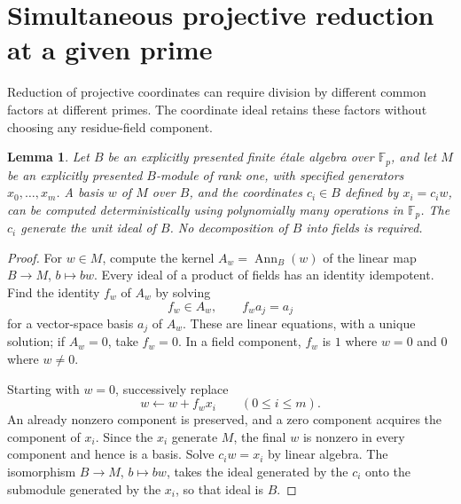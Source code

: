 \documentclass[11pt]{article}
\newtheorem{lemma}[theorem]{Lemma}
\theoremstyle{definition}
\theoremstyle{remark}
\begin{document}
\section{Simultaneous projective reduction at a given prime}
\label{sec:kummer-projective-reduction}

Reduction of projective coordinates can require division by different
common factors at different primes. The coordinate ideal retains
these factors without choosing any residue-field component.

\begin{lemma}\label{lem:kummer-rank-one-patching}
Let \(B\) be an explicitly presented finite \'etale algebra over
\(\mathbb F_p\), and let \(M\) be an explicitly presented
\(B\)-module of rank one, with specified generators
\(x_0,\ldots,x_m\). A basis \(w\) of \(M\) over \(B\), and
the coordinates \(c_i\in B\) defined by \(x_i=c_iw\), can be
computed deterministically using polynomially many operations in
\(\mathbb F_p\). The \(c_i\) generate the unit ideal of \(B\).
No decomposition of \(B\) into fields is required.
\end{lemma}
\begin{proof}
For \(w\in M\), compute the kernel
\(A_w=\operatorname{Ann}_B(w)\) of the linear map
\(B\longrightarrow M\), \(b\longmapsto bw\).
Every ideal of a product of fields has an identity idempotent.
Find the identity \(f_w\) of \(A_w\) by solving
\[
 f_w\in A_w,\qquad f_wa_j=a_j
\]
for a vector-space basis \(a_j\) of \(A_w\). These are linear
equations, with a unique solution; if \(A_w=0\), take \(f_w=0\).
In a field component, \(f_w\) is \(1\) where \(w=0\) and
\(0\) where \(w\ne0\).

Starting with \(w=0\), successively replace
\[
 w\longleftarrow w+f_wx_i\qquad(0\leq i\leq m).
\]
An already nonzero component is preserved, and a zero component
acquires the component of \(x_i\). Since the \(x_i\) generate
\(M\), the final \(w\) is nonzero in every component and hence
is a basis. Solve \(c_iw=x_i\) by linear algebra. The isomorphism
\(B\longrightarrow M\), \(b\mapsto bw\), takes the ideal
generated by the \(c_i\) onto the submodule generated by the
\(x_i\), so that ideal is \(B\).
\end{proof}
\end{document}
